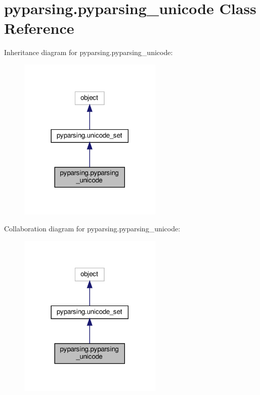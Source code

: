 \hypertarget{classpyparsing_1_1pyparsing__unicode}{}\section{pyparsing.\+pyparsing\+\_\+unicode Class Reference}
\label{classpyparsing_1_1pyparsing__unicode}


Inheritance diagram for pyparsing.\+pyparsing\+\_\+unicode\+:
\nopagebreak
\begin{figure}[H]
\begin{center}
\leavevmode
\includegraphics[width=194pt]{classpyparsing_1_1pyparsing__unicode__inherit__graph}
\end{center}
\end{figure}


Collaboration diagram for pyparsing.\+pyparsing\+\_\+unicode\+:
\nopagebreak
\begin{figure}[H]
\begin{center}
\leavevmode
\includegraphics[width=194pt]{classpyparsing_1_1pyparsing__unicode__coll__graph}
\end{center}
\end{figure}
